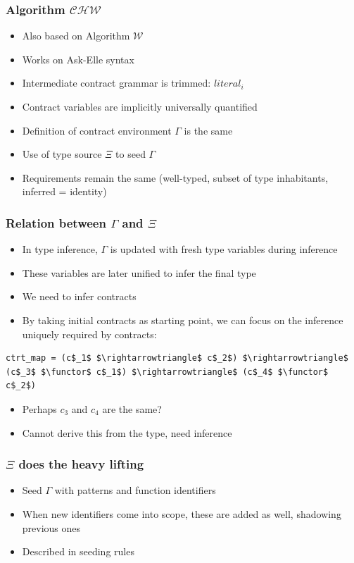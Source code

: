 \documentclass[]{beamer}
\makeatletter
\newcommand{\functor}{<\!\!\!@\!\!\!>}
\newcommand{\W}{$\mathcal{W}$}
\newcommand{\CHW}{$\mathcal{CHW}$}
\makeatother
\begin{document}
\begin{frame}[fragile]
\frametitle{Algorithm \CHW}

\begin{itemize}
	\item Also based on Algorithm \W
	\item Works on Ask-Elle syntax
	\item Intermediate contract grammar is trimmed: $literal_i$
	\item Contract variables are implicitly universally quantified
	\item Definition of contract environment $\Gamma$ is the same
	\item Use of type source $\Xi$ to seed $\Gamma$
	\item Requirements remain the same (well-typed, subset of type inhabitants, inferred = identity)
\end{itemize}

\end{frame}

\begin{frame}[fragile]
\frametitle{Relation between $\Gamma$ and $\Xi$}

\begin{itemize}
	\item In type inference, $\Gamma$ is updated with fresh type variables during inference
	\item These variables are later unified to infer the final type
	\item We need to infer contracts
	\item By taking initial contracts as starting point, we can focus on the inference uniquely required by contracts:
\end{itemize}

\begin{lstlisting}[mathescape]
ctrt_map = (c$_1$ $\rightarrowtriangle$ c$_2$) $\rightarrowtriangle$ (c$_3$ $\functor$ c$_1$) $\rightarrowtriangle$ (c$_4$ $\functor$ c$_2$)
\end{lstlisting}

\begin{itemize}
	\item Perhaps $c_3$ and $c_4$ are the same?
	\item Cannot derive this from the type, need inference
\end{itemize}

\end{frame}

\begin{frame}[fragile]
\frametitle{$\Xi$ does the heavy lifting}

\begin{itemize}
	\item Seed $\Gamma$ with patterns and function identifiers
	\item When new identifiers come into scope, these are added as well, shadowing previous ones
	\item Described in seeding rules
\end{itemize}

\end{frame}
\end{document}
